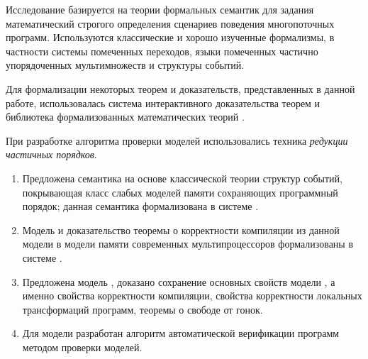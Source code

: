 {\methods}

Исследование базируется на теории формальных семантик для 
задания математический строгого определения сценариев поведения многопоточных программ. 
Используются классические и хорошо изученные формализмы, в частности 
системы помеченных переходов, языки помеченных частично упорядоченных мультимножеств и структуры событий. 

Для формализации некоторых теорем и доказательств, представленных в данной работе, 
использовалась система интерактивного доказательства теорем \coq 
и библиотека формализованных математических теорий \mathcomp.

При разработке алгоритма проверки моделей использовались техника \emph{редукции частичных порядков}.

{}
\begin{enumerate}[beginpenalty=10000] %
  \item Предложена семантика на основе классической теории структур событий, 
    покрывающая класс слабых моделей памяти сохраняющих программный порядок;
    данная семантика формализована в системе \coq.
  \item Модель \Wkm и доказательство теоремы о корректности компиляции
    из данной модели в модели памяти современных мультипроцессоров формализованы в системе \coq.
  \item Предложена модель \WkmS, доказано сохранение основных свойств модели \Wkm,
    а именно свойства корректности компиляции,
    свойства корректности локальных трансформаций программ,
    теоремы о свободе от гонок.
  \item Для модели \WkmS разработан алгоритм автоматической 
    верификации программ методом проверки моделей.
\end{enumerate}

